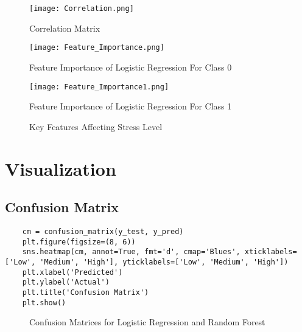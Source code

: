 \documentclass[a4paper,11pt]{article}
\begin{document}
\begin{figure}[H]
    \centering
    \begin{minipage}{0.48\textwidth}
        \centering
        \texttt{[image: Correlation.png]}
        \caption{Correlation Matrix}
        \label{fig:correlation}
    \end{minipage}
    \hfill
    \begin{minipage}{0.48\textwidth}
        \centering
        \texttt{[image: Feature\_Importance.png]}
        \caption{Feature Importance of Logistic Regression For Class 0}
        \label{fig:feature_importance_0}
        
        \vspace{0.3cm} %
        
        \texttt{[image: Feature\_Importance1.png]}
        \caption{Feature Importance of Logistic Regression For Class 1}
        \label{fig:feature_importance_1}
    \end{minipage}
    \caption{Key Features Affecting Stress Level}
    \label{fig:feature_imp}
\end{figure}


\section{Visualization}
\subsection{Confusion Matrix}
\begin{lstlisting}
    cm = confusion_matrix(y_test, y_pred)
    plt.figure(figsize=(8, 6))
    sns.heatmap(cm, annot=True, fmt='d', cmap='Blues', xticklabels=['Low', 'Medium', 'High'], yticklabels=['Low', 'Medium', 'High'])
    plt.xlabel('Predicted')
    plt.ylabel('Actual')
    plt.title('Confusion Matrix')
    plt.show()
\end{lstlisting}

\begin{figure}[H]
    \centering
    \caption{Confusion Matrices for Logistic Regression and Random Forest}
    \label{fig:conf_matrices}
\end{figure}
\end{document}
